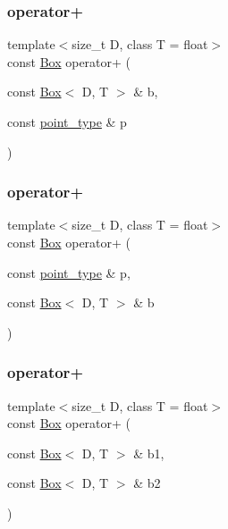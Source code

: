 \subsubsection{\texorpdfstring{operator+}{operator+}\hspace{0.1cm}{\footnotesize\ttfamily [1/3]}}
{\footnotesize\ttfamily template$<$size\+\_\+t D, class T = float$>$ \\
const \hyperlink{classtrimesh_1_1Box}{Box} operator+ (\begin{DoxyParamCaption}\item[{const \hyperlink{classtrimesh_1_1Box}{Box}$<$ D, T $>$ \&}]{b,  }\item[{const \hyperlink{classtrimesh_1_1Box_a208c806781f96a7001491a275dfa7655}{point\+\_\+type} \&}]{p }\end{DoxyParamCaption})\hspace{0.3cm}{\ttfamily [friend]}}

\mbox{\label{classtrimesh_1_1Box_ad2d14571fddd30993d281b575b02a7be}} 
\subsubsection{\texorpdfstring{operator+}{operator+}\hspace{0.1cm}{\footnotesize\ttfamily [2/3]}}
{\footnotesize\ttfamily template$<$size\+\_\+t D, class T = float$>$ \\
const \hyperlink{classtrimesh_1_1Box}{Box} operator+ (\begin{DoxyParamCaption}\item[{const \hyperlink{classtrimesh_1_1Box_a208c806781f96a7001491a275dfa7655}{point\+\_\+type} \&}]{p,  }\item[{const \hyperlink{classtrimesh_1_1Box}{Box}$<$ D, T $>$ \&}]{b }\end{DoxyParamCaption})\hspace{0.3cm}{\ttfamily [friend]}}

\mbox{\label{classtrimesh_1_1Box_a3bde7aa47ecb941209e87db7d3fe2e70}} 
\subsubsection{\texorpdfstring{operator+}{operator+}\hspace{0.1cm}{\footnotesize\ttfamily [3/3]}}
{\footnotesize\ttfamily template$<$size\+\_\+t D, class T = float$>$ \\
const \hyperlink{classtrimesh_1_1Box}{Box} operator+ (\begin{DoxyParamCaption}\item[{const \hyperlink{classtrimesh_1_1Box}{Box}$<$ D, T $>$ \&}]{b1,  }\item[{const \hyperlink{classtrimesh_1_1Box}{Box}$<$ D, T $>$ \&}]{b2 }\end{DoxyParamCaption})\hspace{0.3cm}{\ttfamily [friend]}}

